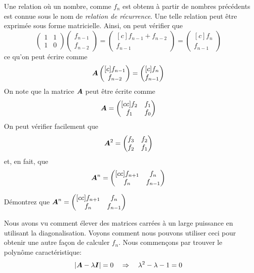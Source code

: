 Une relation où un nombre, comme $f_n$ est obtenu à partir de nombres précédents est connue sous le 
nom de \textit{relation de récurrence}.  Une telle relation peut être exprimée sous forme matricielle.
Ainsi, on peut vérifier que
\[
\begin{pmatrix}
1 & 1 \\
1 & 0
\end{pmatrix} \begin{pmatrix}
f_{n-1} \\
f_{n-2}
\end{pmatrix}
=
\begin{pmatrix}[c]
f_{n-1} + f_{n-2} \\
f_{n-1}
\end{pmatrix}
=
\begin{pmatrix}[c]
f_n \\
f_{n-1}
\end{pmatrix}
\]
ce qu'on peut écrire comme
\[
\boldsymbol{A} \begin{pmatrix}[c]
f_{n-1} \\
f_{n-2}
\end{pmatrix} = 
\begin{pmatrix}[c]
f_n \\
f_{n-1}
\end{pmatrix}
\]
On note que la matrice $\boldsymbol{A}$ peut être écrite comme
\[
\boldsymbol{A} = \begin{pmatrix}[cc]
f_2 & f_1 \\
f_1 & f_0
\end{pmatrix}
\]
On peut vérifier facilement que
\[
\boldsymbol{A}^2 = \begin{pmatrix}
f_3 & f_2 \\
f_2 & f_1
\end{pmatrix}
\]
et, en fait, que
\[
\boldsymbol{A}^n = \begin{pmatrix}[cc]
f_{n+1} & f_n \\
f_n & f_{n-1}
\end{pmatrix}
\]
\begin{exerciceC}
Démontrez que $\displaystyle \boldsymbol{A}^n = \begin{pmatrix}[cc]
f_{n+1} & f_n \\
f_n & f_{n-1}
\end{pmatrix} $
\end{exerciceC}
Nous avons vu comment élever des matrices carrées à un large puissance en utilisant la diagonalisation.  Voyons
comment nous pouvons utiliser ceci pour obtenir une autre façon de calculer $f_n$.
Nous commençons par trouver le polynôme caractéristique:
\[
|\boldsymbol{A} - \lambda \boldsymbol{I}|   = 0  \quad\Rightarrow\quad \lambda^2 - \lambda -1 = 0  
\]

